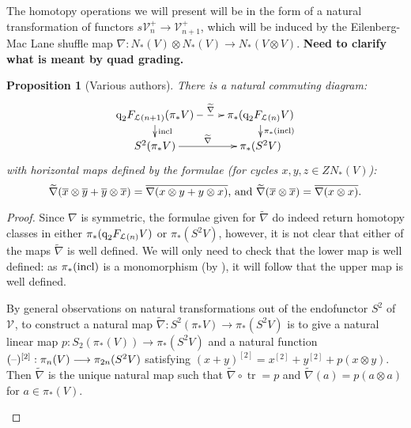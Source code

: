 \documentclass[11pt]{amsart}
\theoremstyle{plain}
\newtheorem{prop}[thm]{Proposition}
\theoremstyle{definition}
\DeclareMathOperator{\trace}{tr}
\newcommand{\DASH}{\textup{--}}
\renewcommand{\to}{\longrightarrow}
\newcommand{\calL}{\mathcal{L}}
\newcommand{\calV}{\mathcal{V}}
\theoremstyle{plain}
\newcommand{\restn}[1]{#1^{[2]}}
\newcommand{\vect}[2]{\calV^{#1}_{#2}}
\newcommand{\quadgrad}[1]{\textup{q}_{#1}}
\begin{document}
\begin{homotopy operations for PRLs}
The homotopy operations we will present will be in the form of a natural transformation of functors $s\vect{+}{n}\to \vect{+}{n+1}$, which will be induced by the Eilenberg-Mac Lane shuffle map $\nabla:N_*(V)\otimes N_*(V)\to N_*(V\otimes V)$. \textbf{Need to clarify what is meant by quad grading.}
\begin{prop}[Various authors]\label{the top homotopy operations for Lie algebras}
There is a natural commuting diagram:
\[\xymatrix@R=4mm{
\quadgrad{2}F_{\calL(n+1)}(\pi_*V)\ar@{-->}[r]^-{\widetilde{\nabla}}
\ar[d]^-{\textup{incl}}
&%
\pi_*(\quadgrad{2}F_{\calL(n)}V)\ar[d]^-{\pi_*(\textup{incl})}
\\%
S^2(\pi_*V)\ar[r]^-{\widetilde{\nabla}}&%
\pi_*(S^2V)%
}\]
with horizontal maps defined by the formulae (for cycles $x,y,z\in ZN_*(V)$):
\[\widetilde{\nabla}(\overline{x}\otimes \overline{y}+\overline{y}\otimes \overline{x})=\overline{\nabla(x\otimes y+y\otimes x)}\textup{, and }\widetilde{\nabla}(\overline{x}\otimes\overline{x})=\overline{\nabla(x\otimes x)}.\]
\end{prop}
\begin{proof}
Since $\nabla$ is symmetric, the formulae given for $\widetilde{\nabla}$ do indeed return homotopy classes in either $\pi_*(\quadgrad{2}F_{\calL(n)}V)$ or $\pi_*(S^2V)$, however, it is not clear that either of the maps $\widetilde{\nabla}$ is well defined. We will only need to check that the lower map is well defined: as $\pi_*(\textup{incl})$ is a monomorphism (by \cite[Prop 5.6]{BousOpnsDerFun.pdf}), it will follow that the upper map is well defined. 
\begin{shaded}\tiny
By general observations on natural transformations out of the endofunctor $S^2$ of $\vect{}{}$, to construct a natural map $\widetilde{\nabla}:S^2(\pi_*V)\to\pi_*(S^2V)$ is to give a natural linear map $p:S_2(\pi_*(V))\to \pi_*(S^2V)$ and a natural function $\restn{(\DASH)}:\pi_n(V)\to \pi_{2n}(S^2V)$ satisfying $\restn{(x+y)}=\restn{x}+\restn{y}+p(x\otimes y)$. Then $\widetilde{\nabla}$ is the unique natural map such that $\widetilde{\nabla}\circ\trace=p$ and $\widetilde{\nabla}(a)=p(a\otimes a)$ for $a\in\pi_*\left(V\right)$.

\end{shaded}
\end{proof}
\end{homotopy operations for PRLs}
\end{document}
